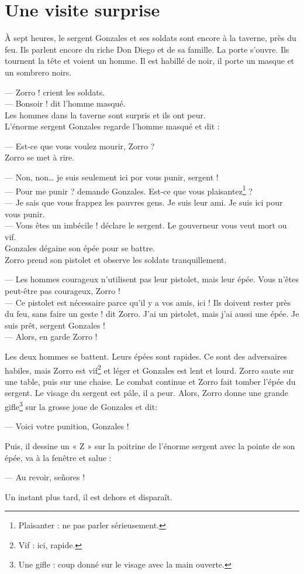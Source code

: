 \chapter{Une visite surprise}
À sept heures, le sergent Gonzales et ses soldats sont encore à la taverne, près du feu. Ils parlent encore du riche Don Diego et
de sa famille. La porte s'ouvre. Ils tournent la tête et voient un homme. Il est habillé de noir, il porte un masque et un
sombrero noirs.

--- Zorro ! crient les soldats.\\
--- Bonsoir ! dit l'homme masqué.\\

Les hommes dans la taverne sont surpris et ils ont peur.\\
L'énorme sergent Gonzales regarde l'homme masqué et dit :

--- Est-ce que vous voulez mourir, Zorro ?\\

Zorro se met à rire.

--- Non, non\ldots{} je suis seulement ici por vous punir, sergent !\\
--- Pour me punir ? demande Gonzales. Est-ce que vous plaisantez\footnote{Plaisanter : ne pas parler sérieusement.} ?\\
--- Je sais que vous frappez les pauvres gens. Je suis leur ami. Je suis ici pour vous punir.\\
--- Vous êtes un imbécile ! déclare le sergent. Le gouverneur vous veut mort ou vif.\\

Gonzales dégaine son épée pour se battre.\\
Zorro prend son pistolet et observe les soldats tranquillement.

--- Les hommes courageux n'utilisent pas leur pistolet, mais leur épée. Vous n'êtes peut-être pas courageux, Zorro !\\
--- Ce pistolet est nécessaire parce qu'il y a vos amis, ici ! Ils doivent rester près du feu, sans faire un geste ! dit Zorro.
    J'ai un pistolet, mais j'ai aussi une épée. Je suis prêt, sergent Gonzales !\\
--- Alors, en garde Zorro !

Les deux hommes se battent. Leurs épées sont rapides. Ce sont des adversaires habiles, mais Zorro est vif\footnote{Vif : ici,
rapide.} et léger et Gonzales est lent et lourd. Zorro saute sur une table, puis sur une chaise. Le combat continue et Zorro fait
tomber l'épée du sergent. Le visage du sergent est pâle, il a peur. Alors, Zorro donne une grande gifle\footnote{Une gifle : coup
donné sur le visage avec la main ouverte.} sur la grosse joue de Gonzales et dit:

--- Voici votre punition, Gonzales !

Puis, il dessine un « Z » sur la poitrine de l'énorme sergent avec la pointe de son épée, va à la fenêtre et salue :

--- Au revoir, señores !

Un instant plus tard, il est dehors et disparaît.
